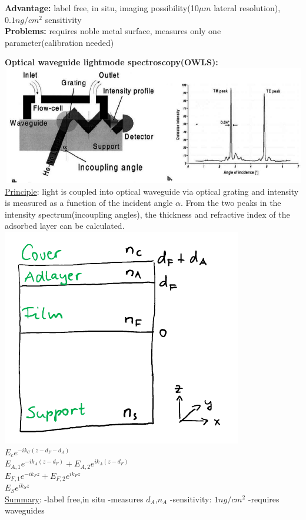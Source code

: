 \documentclass[9pt]{article}
\begin{document}
\begin{multicols}{2}
\textbf{Advantage:} label free, in situ,  imaging possibility(10$\mu m$ lateral resolution), $0.1ng/cm^2$ sensitivity\\
\textbf{Problems:} requires noble metal surface, measures only one parameter(calibration needed)
				
\textbf{Optical waveguide lightmode spectroscopy(OWLS):}\\
\includegraphics[width=\linewidth]{Images/OWLS.png}
\underline{Principle}: light is coupled into optical waveguide via optical grating
and intensity is measured as a function of the incident angle $\alpha$.
From the two peaks in the intensity spectrum(incoupling angles), the thickness and
refractive index of the adsorbed layer can be calculated.\\

\includegraphics[scale=0.3]{Images/OWLS2.png}
$E_c e^{-ik_C(z-d_F-d_A)}$\\
$E_{A,1}e^{-ik_A(z-d_F)}{+}E_{A,2}e^{ik_A(z-d_F)}$\\
$E_{F,1}e^{-ik_Fz}{+}E_{F,2}e^{ik_Fz}$\\
$E_Se^{ik_Sz}$\\
\underline{Summary}: 
-label free,in situ 
-measures $d_A$,$n_A$ 
-sensitivity: $1ng/cm^2$ 
-requires waveguides 


\end{multicols}
\end{document}
